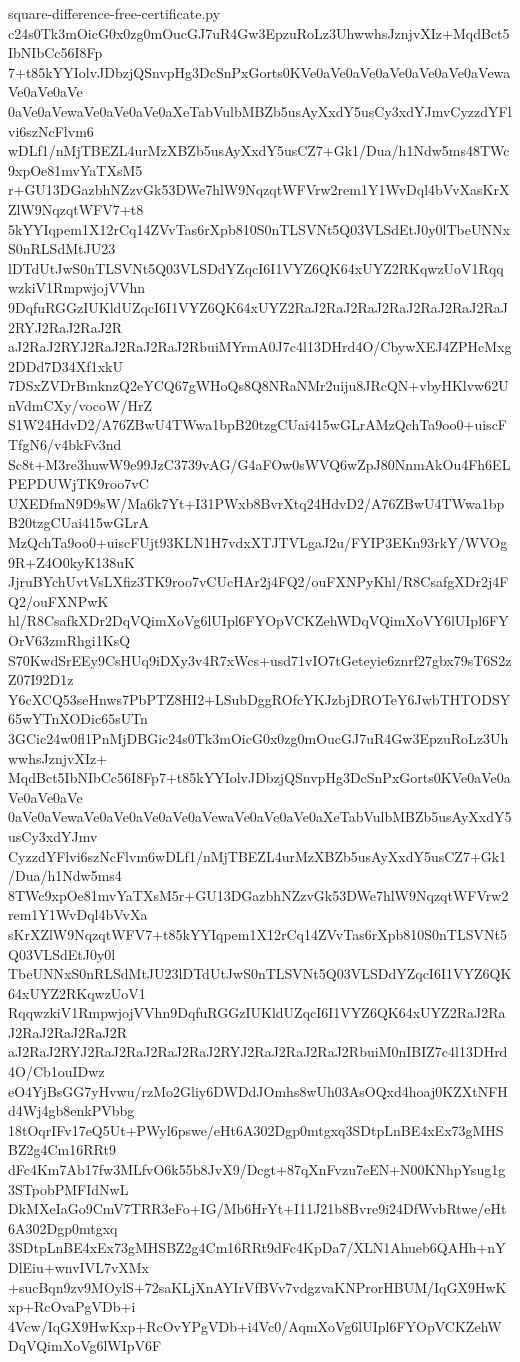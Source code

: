 \documentclass[11pt]{article}
\theoremstyle{definition}
\theoremstyle{remark}
\begin{document}
\begin{filecontents*}[overwrite]{square-difference-free-certificate.py}
c24s0Tk3mOicG0x0zg0mOucGJ7uR4Gw3EpzuRoLz3UhwwhsJznjvXIz+MqdBct5IbNIbCc56I8Fp
7+t85kYYIolvJDbzjQSnvpHg3DcSnPxGorts0KVe0aVe0aVe0aVe0aVe0aVe0aVewaVe0aVe0aVe
0aVe0aVewaVe0aVe0aVe0aXeTabVulbMBZb5usAyXxdY5usCy3xdYJmvCyzzdYFlvi6szNcFlvm6
wDLf1/nMjTBEZL4urMzXBZb5usAyXxdY5usCZ7+Gk1/Dua/h1Ndw5ms48TWc9xpOe81mvYaTXsM5
r+GU13DGazbhNZzvGk53DWe7hlW9NqzqtWFVrw2rem1Y1WvDql4bVvXasKrXZlW9NqzqtWFV7+t8
5kYYIqpem1X12rCq14ZVvTas6rXpb810S0nTLSVNt5Q03VLSdEtJ0y0lTbeUNNxS0nRLSdMtJU23
lDTdUtJwS0nTLSVNt5Q03VLSDdYZqcI6I1VYZ6QK64xUYZ2RKqwzUoV1RqqwzkiV1RmpwjojVVhn
9DqfuRGGzIUKldUZqcI6I1VYZ6QK64xUYZ2RaJ2RaJ2RaJ2RaJ2RaJ2RaJ2RaJ2RYJ2RaJ2RaJ2R
aJ2RaJ2RYJ2RaJ2RaJ2RaJ2RbuiMYrmA0J7c4l13DHrd4O/CbywXEJ4ZPHcMxg2DDd7D34Xf1xkU
7DSxZVDrBmknzQ2eYCQ67gWHoQs8Q8NRaNMr2uiju8JRcQN+vbyHKlvw62UnVdmCXy/vocoW/HrZ
S1W24HdvD2/A76ZBwU4TWwa1bpB20tzgCUai415wGLrAMzQchTa9oo0+uiscFTfgN6/v4bkFv3nd
Sc8t+M3re3huwW9e99JzC3739vAG/G4aFOw0sWVQ6wZpJ80NnmAkOu4Fh6ELPEPDUWjTK9roo7vC
UXEDfmN9D9sW/Ma6k7Yt+I31PWxb8BvrXtq24HdvD2/A76ZBwU4TWwa1bpB20tzgCUai415wGLrA
MzQchTa9oo0+uiscFUjt93KLN1H7vdxXTJTVLgaJ2u/FYIP3EKn93rkY/WVOg9R+Z4O0kyK138uK
JjruBYchUvtVsLXfiz3TK9roo7vCUcHAr2j4FQ2/ouFXNPyKhl/R8CsafgXDr2j4FQ2/ouFXNPwK
hl/R8CsafkXDr2DqVQimXoVg6lUIpl6FYOpVCKZehWDqVQimXoVY6lUIpl6FYOrV63zmRhgi1KsQ
S70KwdSrEEy9CsHUq9iDXy3v4R7xWcs+usd71vIO7tGeteyie6znrf27gbx79sT6S2zZ07I92D1z
Y6cXCQ53seHnws7PbPTZ8HI2+LSubDggROfcYKJzbjDROTeY6JwbTHTODSY65wYTnXODic65sUTn
3GCic24w0fl1PnMjDBGic24s0Tk3mOicG0x0zg0mOucGJ7uR4Gw3EpzuRoLz3UhwwhsJznjvXIz+
MqdBct5IbNIbCc56I8Fp7+t85kYYIolvJDbzjQSnvpHg3DcSnPxGorts0KVe0aVe0aVe0aVe0aVe
0aVe0aVewaVe0aVe0aVe0aVe0aVewaVe0aVe0aVe0aXeTabVulbMBZb5usAyXxdY5usCy3xdYJmv
CyzzdYFlvi6szNcFlvm6wDLf1/nMjTBEZL4urMzXBZb5usAyXxdY5usCZ7+Gk1/Dua/h1Ndw5ms4
8TWc9xpOe81mvYaTXsM5r+GU13DGazbhNZzvGk53DWe7hlW9NqzqtWFVrw2rem1Y1WvDql4bVvXa
sKrXZlW9NqzqtWFV7+t85kYYIqpem1X12rCq14ZVvTas6rXpb810S0nTLSVNt5Q03VLSdEtJ0y0l
TbeUNNxS0nRLSdMtJU23lDTdUtJwS0nTLSVNt5Q03VLSDdYZqcI6I1VYZ6QK64xUYZ2RKqwzUoV1
RqqwzkiV1RmpwjojVVhn9DqfuRGGzIUKldUZqcI6I1VYZ6QK64xUYZ2RaJ2RaJ2RaJ2RaJ2RaJ2R
aJ2RaJ2RYJ2RaJ2RaJ2RaJ2RaJ2RYJ2RaJ2RaJ2RaJ2RbuiM0nIBIZ7c4l13DHrd4O/Cb1ouIDwz
eO4YjBsGG7yHvwu/rzMo2Gliy6DWDdJOmhs8wUh03AsOQxd4hoaj0KZXtNFHd4Wj4gb8enkPVbbg
18tOqrIFv17eQ5Ut+PWyl6pswe/eHt6A302Dgp0mtgxq3SDtpLnBE4xEx73gMHSBZ2g4Cm16RRt9
dFc4Km7Ab17fw3MLfvO6k55b8JvX9/Dcgt+87qXnFvzu7eEN+N00KNhpYsug1g3STpobPMFIdNwL
DkMXeIaGo9CmV7TRR3eFo+IG/Mb6HrYt+I11J21b8Bvre9i24DfWvbRtwe/eHt6A302Dgp0mtgxq
3SDtpLnBE4xEx73gMHSBZ2g4Cm16RRt9dFc4KpDa7/XLN1Ahueb6QAHh+nYDlEiu+wnvIVL7vXMx
+sucBqn9zv9MOylS+72saKLjXnAYIrVfBVv7vdgzvaKNProrHBUM/IqGX9HwKxp+RcOvaPgVDb+i
4Vcw/IqGX9HwKxp+RcOvYPgVDb+i4Vc0/AqmXoVg6lUIpl6FYOpVCKZehWDqVQimXoVg6lWIpV6F

\end{filecontents*}
\end{document}

